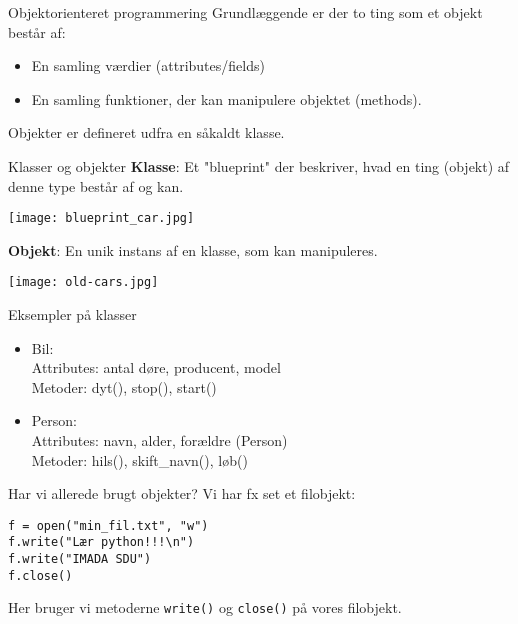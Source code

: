 \documentclass[main.tex]{subfiles}
\begin{document}
\begin{frame}{Objektorienteret programmering}
	Grundlæggende er der to ting som et objekt består af:
	\begin{itemize}
		\item En samling værdier (attributes/fields)
		\item En samling funktioner, der kan manipulere objektet (methods).
	\end{itemize}

	\pause
	Objekter er defineret udfra en såkaldt klasse.
\end{frame}

\begin{frame}{Klasser og objekter}
	\textbf{Klasse}: Et "blueprint" der beskriver, hvad en ting (objekt) af denne type består af og kan.
	\begin{center}
	\texttt{[image: blueprint\_car.jpg]}
	\end{center}
	
	\vfill
	\textbf{Objekt}: En unik instans af en klasse, som kan manipuleres.\\
	\begin{center}
	\texttt{[image: old-cars.jpg]}
	\end{center}

\end{frame}


\begin{frame}{Eksempler på klasser}
	\begin{itemize}
		\item Bil: \\
			Attributes: antal døre, producent, model\\
			Metoder: dyt(), stop(), start()
		\item Person: \\
			Attributes: navn, alder, forældre (Person)\\
			Metoder: hils(), skift\_navn(), løb()
	\end{itemize}
\end{frame}


\begin{frame}[fragile]{Har vi allerede brugt objekter?}
	\pause
	Vi har fx set et filobjekt:
	\begin{lstlisting}[style=python]
f = open("min_fil.txt", "w")
f.write("Lær python!!!\n")
f.write("IMADA SDU")
f.close()
	\end{lstlisting}
	Her bruger vi metoderne \texttt{write()} og \texttt{close()} på vores filobjekt.\\
\end{frame}
\end{document}
